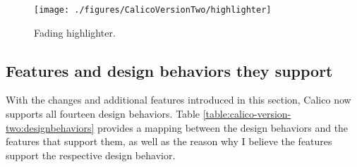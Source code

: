 \begin{figure*}[tbh]
  \centering
  \texttt{[image: ./figures/CalicoVersionTwo/highlighter]}
  \caption{Fading highlighter.}
  \label{fig:calico-version-two:overviewd}
\end{figure*}


\subsection{Features and design behaviors they support}

With the changes and additional features introduced in this section, Calico now supports all fourteen design behaviors. Table \ref{table:calico-version-two:designbehaviors} provides a mapping between the design behaviors and the features that support them, as well as the reason why I believe the features support the respective design behavior.

